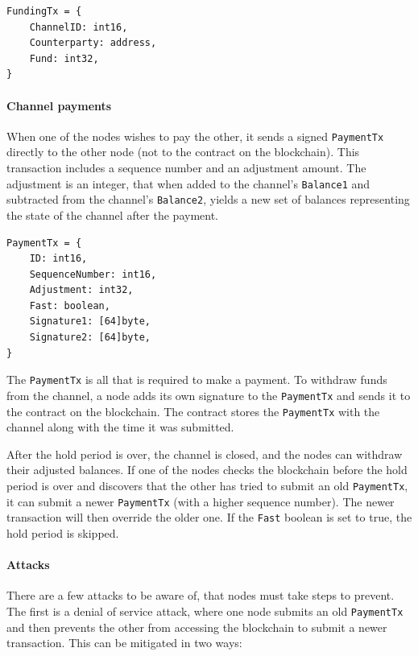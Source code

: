 \documentclass[11pt]{article}
\begin{document}
\begin{minipage}[c]{\textwidth}
\begin{lstlisting}
FundingTx = {
	ChannelID: int16,
	Counterparty: address,
	Fund: int32,
}
\end{lstlisting}
\end{minipage}

\paragraph{Channel payments}
When one of the nodes wishes to pay the other, it sends a signed \texttt{PaymentTx} directly to the other node (not to the contract on the blockchain). This transaction includes a sequence number and an adjustment amount. The adjustment is an integer, that when added to the channel’s \texttt{Balance1} and subtracted from the channel’s \texttt{Balance2}, yields a new set of balances representing the state of the channel after the payment.

\begin{minipage}[c]{\textwidth}
\begin{lstlisting}
PaymentTx = {
	ID: int16,
	SequenceNumber: int16,
	Adjustment: int32,
	Fast: boolean,
	Signature1: [64]byte,
	Signature2: [64]byte,
}
\end{lstlisting}
\end{minipage}

The \texttt{PaymentTx} is all that is required to make a payment. To withdraw funds from the channel, a node adds its own signature to the \texttt{PaymentTx} and sends it to the contract on the blockchain. The contract stores the \texttt{PaymentTx} with the channel along with the time it was submitted.

After the hold period is over, the channel is closed, and the nodes can withdraw their adjusted balances. If one of the nodes checks the blockchain before the hold period is over and discovers that the other has tried to submit an old \texttt{PaymentTx}, it can submit a newer \texttt{PaymentTx} (with a higher sequence number). The newer transaction will then override the older one. If the \texttt{Fast} boolean is set to true, the hold period is skipped.
 
\paragraph{Attacks}
There are a few attacks to be aware of, that nodes must take steps to prevent. The first is a denial of service attack, where one node submits an old \texttt{PaymentTx} and then prevents the other from accessing the blockchain to submit a newer transaction. This can be mitigated in two ways:
\end{document}

